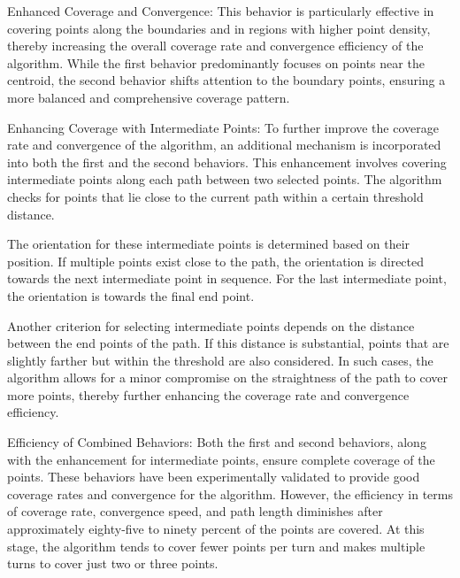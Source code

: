\vspace{3mm}   

Enhanced Coverage and Convergence: This behavior is particularly effective in covering points along the boundaries and in regions with higher point density, thereby increasing the overall coverage rate and convergence efficiency of the algorithm. While the first behavior predominantly focuses on points near the centroid, the second behavior shifts attention to the boundary points, ensuring a more balanced and comprehensive coverage pattern.


\vspace{3mm}   

Enhancing Coverage with Intermediate Points: To further improve the coverage rate and convergence of the algorithm, an additional mechanism is incorporated into both the first and the second behaviors. This enhancement involves covering intermediate points along each path between two selected points. The algorithm checks for points that lie close to the current path within a certain threshold distance.

\vspace{3mm}   

The orientation for these intermediate points is determined based on their position. If multiple points exist close to the path, the orientation is directed towards the next intermediate point in sequence. For the last intermediate point, the orientation is towards the final end point.

\vspace{3mm}   

Another criterion for selecting intermediate points depends on the distance between the end points of the path. If this distance is substantial, points that are slightly farther but within the threshold are also considered. In such cases, the algorithm allows for a minor compromise on the straightness of the path to cover more points, thereby further enhancing the coverage rate and convergence efficiency.

\vspace{3mm}   

Efficiency of Combined Behaviors: Both the first and second behaviors, along with the enhancement for intermediate points, ensure complete coverage of the points. These behaviors have been experimentally validated to provide good coverage rates and convergence for the algorithm. However, the efficiency in terms of coverage rate, convergence speed, and path length diminishes after approximately eighty-five to ninety percent of the points are covered. At this stage, the algorithm tends to cover fewer points per turn and makes multiple turns to cover just two or three points.

